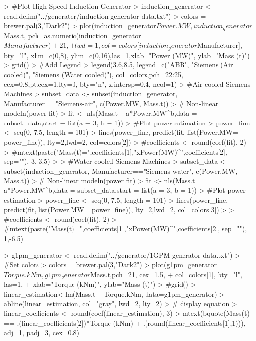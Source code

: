 \documentclass{article}
\begin{document}
\begin{Schunk}
\begin{Sinput}
> #Plot High Speed Induction Generator
> induction_generator <- read.delim("../generator/induction-generator-data.txt")
> colors = brewer.pal(3,"Dark2")
> plot(induction_generator$Power.MW, induction_generator$Mass.t, pch=as.numeric(induction_generator$Manufacturer)+21, 
+      lwd=1, col=colors[induction_generator$Manufacturer], bty="l", xlim=c(0,8), ylim=c(0,16),las=1,xlab="Power (MW)", ylab="Mass (t)")
> grid()
> #Add Legend
> legend(3.6,8.5, legend=c("ABB", "Siemens (Air cooled)", "Siemens (Water cooled)"), col=colors,pch=22:25, cex=0.8,pt.cex=1,lty=0, bty="n", x.intersp=0.4, ncol=1)
> #Air cooled Siemens Machines
> subset_data <- subset(induction_generator, Manufacturer=="Siemens-air", c(Power.MW, Mass.t))
> # Non-linear modeln(power fit)
> fit <- nls(Mass.t ~ a*Power.MW^b,data = subset_data,start = list(a = 3, b = 1))
> #Plot power estimation
> power_fine <- seq(0, 7.5, length = 101)
> lines(power_fine, predict(fit, list(Power.MW= power_fine)), lty=2,lwd=2, col=colors[2])
> #coefficients <- round(coef(fit), 2) 
> #mtext(paste("Mass(t)=",coefficients[1],"xPower(MW)^",coefficients[2], sep=""), 3,-3.5)
> 
> #Water cooled Siemens Machines
> subset_data <- subset(induction_generator, Manufacturer=="Siemens-water", c(Power.MW, Mass.t))
> # Non-linear modeln(power fit)
> fit <- nls(Mass.t ~ a*Power.MW^b,data = subset_data,start = list(a = 3, b = 1))
> #Plot power estimation
> power_fine <- seq(0, 7.5, length = 101)
> lines(power_fine, predict(fit, list(Power.MW= power_fine)), lty=2,lwd=2, col=colors[3])
> 
> #coefficients <- round(coef(fit), 2) 
> #mtext(paste("Mass(t)=",coefficients[1],"xPower(MW)^",coefficients[2], sep=""), 1,-6.5)
\end{Sinput}
\end{Schunk}



\begin{Schunk}
\begin{Sinput}
> g1pm_generator <- read.delim("../generator/1GPM-generator-data.txt")
> #Set colors
> colors = brewer.pal(3,"Dark2")
> plot(g1pm_generator$Torque.kNm, g1pm_generator$Mass.t,pch=21, cex=1.5, 
+      col=colors[1], bty="l", las=1,
+      xlab="Torque (kNm)", ylab="Mass (t)")
> #grid()
> linear_estimation<-lm(Mass.t ~ Torque.kNm, data=g1pm_generator)
> abline(linear_estimation, col="gray", lwd=2, lty=2)
> # display equation
> linear_coefficients <- round(coef(linear_estimation), 3) 
> mtext(bquote(Mass(t) == .(linear_coefficients[2])*Torque (kNm) + .(round(linear_coefficients[1],1))), adj=1, padj=3, cex=0.8)
\end{Sinput}
\end{Schunk}
\end{document}
